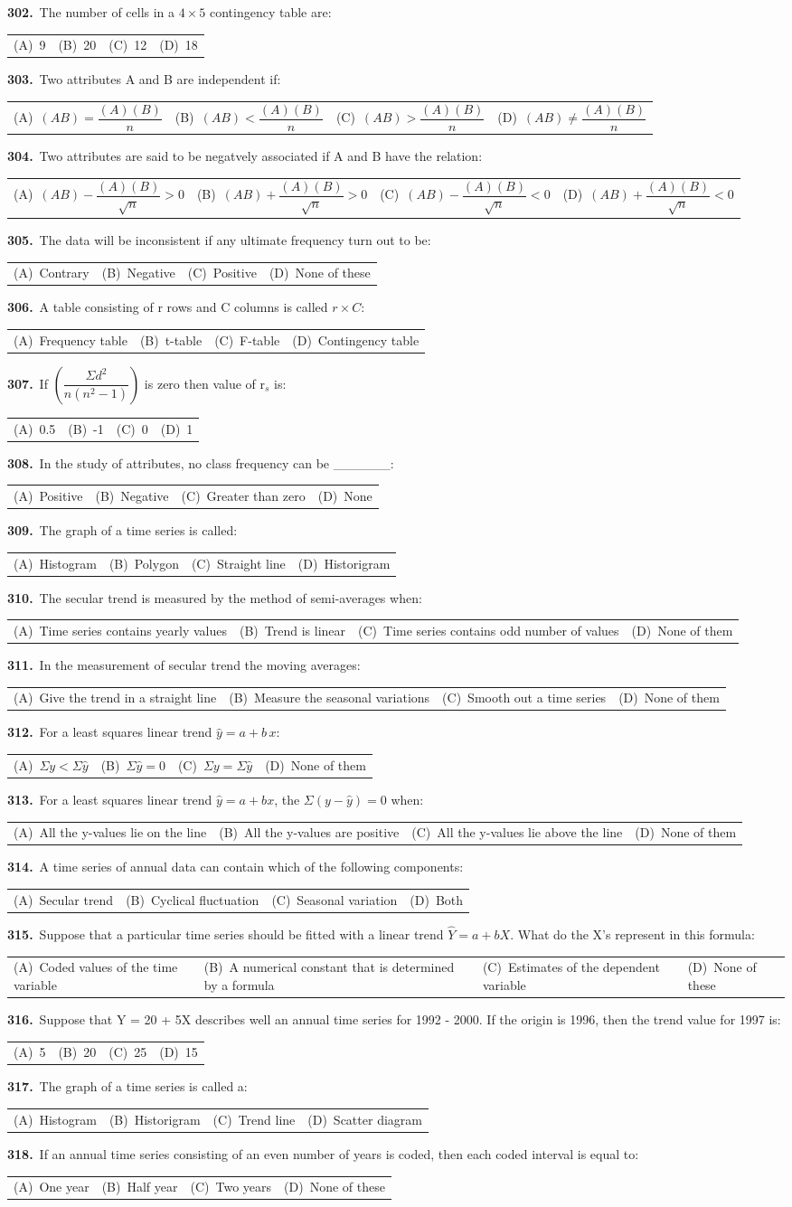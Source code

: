 \documentclass[11pt,a4paper]{article}
\makeatletter
\newcommand{\mcq}[6]{%
  \Needspace{4\baselineskip}%
  \par\medskip\noindent\textbf{#1.}\ #2\par\nopagebreak
  \noindent\begin{tabularx}{\linewidth}{@{\hspace{1.5em}}*{4}{>{\raggedright\arraybackslash}X}@{}}
    (A)~#3 & (B)~#4 & (C)~#5 & (D)~#6
  \end{tabularx}\par}
\makeatother
\begin{document}
\mcq{302}{The number of cells in a $4\times5$ contingency table are:}{9}{20}{12}{18}
\mcq{303}{Two attributes A and B are independent if:}{$(AB)=\dfrac{(A)(B)}{n}$}{$(AB)<\dfrac{(A)(B)}{n}$}{$(AB)>\dfrac{(A)(B)}{n}$}{$(AB)\neq\dfrac{(A)(B)}{n}$}
\mcq{304}{Two attributes are said to be negatvely associated if A and B have the relation:}{$(AB)-\dfrac{(A)(B)}{\sqrt{n}}>0$}{$(AB)+\dfrac{(A)(B)}{\sqrt{n}}>0$}{$(AB)-\dfrac{(A)(B)}{\sqrt{n}}<0$}{$(AB)+\dfrac{(A)(B)}{\sqrt{n}}<0$}
\mcq{305}{The data will be inconsistent if any ultimate frequency turn out to be:}{Contrary}{Negative}{Positive}{None of these}
\mcq{306}{A table consisting of r rows and C columns is called $r\times C$:}{Frequency table}{t-table}{F-table}{Contingency table}
\mcq{307}{If $\left(\dfrac{\Sigma d^{2}}{n(n^{2}-1)}\right)$ is zero then value of r$_{s}$ is:}{0.5}{-1}{0}{1}
\mcq{308}{In the study of attributes, no class frequency can be \_\_\_\_\_\_:}{Positive}{Negative}{Greater than zero}{None}
\mcq{309}{The graph of a time series is called:}{Histogram}{Polygon}{Straight line}{Historigram}
\mcq{310}{The secular trend is measured by the method of semi-averages when:}{Time series contains yearly values}{Trend is linear}{Time series contains odd number of values}{None of them}
\mcq{311}{In the measurement of secular trend the moving averages:}{Give the trend in a straight line}{Measure the seasonal variations}{Smooth out a time series}{None of them}
\mcq{312}{For a least squares linear trend $\widehat{y}=a+b\,x$:}{$\Sigma y<\Sigma\widehat{y}$}{$\Sigma\widehat{y}=0$}{$\Sigma y=\Sigma\widehat{y}$}{None of them}
\mcq{313}{For a least squares linear trend $\widehat{y}=a+bx$, the $\Sigma(y-\widehat{y})=0$ when:}{All the y-values lie on the line}{All the y-values are positive}{All the y-values lie above the line}{None of them}
\mcq{314}{A time series of annual data can contain which of the following components:}{Secular trend}{Cyclical fluctuation}{Seasonal variation}{Both}
\mcq{315}{Suppose that a particular time series should be fitted with a linear trend $\widehat{Y}=a+bX$. What do the X's represent in this formula:}{Coded values of the time variable}{A numerical constant that is determined by a formula}{Estimates of the dependent variable}{None of these}
\mcq{316}{Suppose that Y = 20 + 5X describes well an annual time series for 1992 - 2000. If the origin is 1996, then the trend value for 1997 is:}{5}{20}{25}{15}
\mcq{317}{The graph of a time series is called a:}{Histogram}{Historigram}{Trend line}{Scatter diagram}
\mcq{318}{If an annual time series consisting of an even number of years is coded, then each coded interval is equal to:}{One year}{Half year}{Two years}{None of these}
\end{document}

